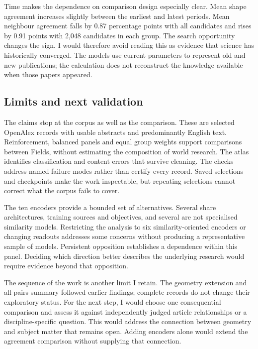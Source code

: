 \documentclass[12pt]{article}
\begin{document}
Time makes the dependence on comparison design especially clear. Mean shape agreement increases slightly between the earliest and latest periods. Mean neighbour agreement falls by 0.87 percentage points with all candidates and rises by 0.91 points with 2,048 candidates in each group. The search opportunity changes the sign. I would therefore avoid reading this as evidence that science has historically converged. The models use current parameters to represent old and new publications; the calculation does not reconstruct the knowledge available when those papers appeared.

\subsection{Limits and next validation}
The claims stop at the corpus as well as the comparison. These are selected OpenAlex records with usable abstracts and predominantly English text. Reinforcement, balanced panels and equal group weights support comparisons between Fields, without estimating the composition of world research. The atlas identifies classification and content errors that survive cleaning. The checks address named failure modes rather than certify every record. Saved selections and checkpoints make the work inspectable, but repeating selections cannot correct what the corpus fails to cover.

The ten encoders provide a bounded set of alternatives. Several share architectures, training sources and objectives, and several are not specialised similarity models. Restricting the analysis to six similarity-oriented encoders or changing readouts addresses some concerns without producing a representative sample of models. Persistent opposition establishes a dependence within this panel. Deciding which direction better describes the underlying research would require evidence beyond that opposition.

The sequence of the work is another limit I retain. The geometry extension and all-pairs summary followed earlier findings; complete records do not change their exploratory status. For the next step, I would choose one consequential comparison and assess it against independently judged article relationships or a discipline-specific question. This would address the connection between geometry and subject matter that remains open. Adding encoders alone would extend the agreement comparison without supplying that connection.
\end{document}
